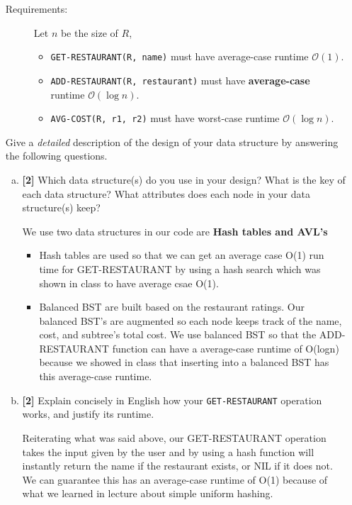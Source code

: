 \documentclass{assignment-263}
\begin{document}
\begin{enumerate}
\begin{description}
\begin{itemize}
    \end{itemize}
  \item[Requirements:] Let $n$ be the size of $R$,
    \begin{itemize}
    \item \texttt{GET-RESTAURANT(R, name)} must have average-case runtime
      $\mathcal{O}(1)$.
    \item \texttt{ADD-RESTAURANT(R, restaurant)} must have
      \textbf{\color{red} average-case} runtime $\mathcal{O}(\log n)$.
    \item \texttt{AVG-COST(R, r1, r2)} must have worst-case runtime
      $\mathcal{O}(\log n)$.
    \end{itemize}
  \end{description}
  Give a \emph{detailed} description of the design of your data
  structure by answering the following questions.

  \begin{enumerate}[(a)]
  \item \textbf{[2]} Which data structure(s) do you use in your design? What is the
    key of each data structure? What attributes does each node in your
    data structure(s) keep? \vskip10pt
    
    We use two data structures in our code are \textbf{Hash tables and AVL's}
     \begin{itemize}
        \item Hash tables are used so that we can get an average case O(1) run time for  GET-RESTAURANT by using a hash search which  was shown in class to have average csae O(1).
        \item Balanced BST are built based on the restaurant ratings. Our balanced BST's are augmented so each node keeps track of the name, cost, and subtree's total cost. We use balanced BST so that the ADD-RESTAURANT function can have a average-case runtime of O(logn) because we showed in class that inserting into a balanced BST has this average-case runtime.
    \end{itemize}
    
    \vskip10pt
  \item \textbf{[2]} Explain concisely in English how your \texttt{GET-RESTAURANT}
    operation works, and justify its runtime. \vskip10pt
    
    Reiterating what was said above, our GET-RESTAURANT operation takes the input given by the user and by using a hash function will instantly return the name if the restaurant exists, or NIL if it does not. We can guarantee this has an average-case runtime of O(1) because of what we learned in lecture about simple uniform hashing. \vskip10pt
   


\end{enumerate}
\end{enumerate}
\end{document}
